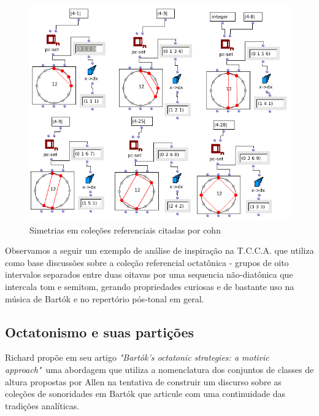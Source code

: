 \documentclass[
	12pt,				%
	openright,			%
	twoside,			%
	a4paper,			%
	english,			%
	french,				%
	spanish,			%
	brazil				%
	]{abntex2}
\begin{document}
\begin{figure}[!h]
	\caption{\label{fig_grafico} Simetrias em coleções referenciais citadas por cohn}
	\begin{center}
	    \includegraphics[scale=0.5]{axis/colecoes_simetricas.png}
	\end{center}
\end{figure}
\pagebreak



Observamos a seguir um exemplo de análise de inspiração na T.C.C.A. que utiliza como base discussões sobre a coleção referencial octatônica - grupos de oito intervalos separados entre duas oitavas por uma sequencia não-diatônica que intercala tom e semitom, gerando propriedades curiosas e de bastante uso na música de Bartók e no repertório pós-tonal em geral.




\subsection{Octatonismo e suas partições}

Richard  propõe em seu artigo \textit{"Bartók's octatonic strategies: a motivic approach"}\ uma abordagem que utiliza a nomenclatura dos conjuntos de classes de altura propostas por Allen  na tentativa de construir um discurso sobre as coleções de sonoridades em Bartók que articule com uma continuidade das tradições analíticas.
\end{document}
